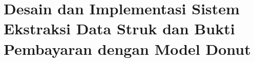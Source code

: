 \chapter{Desain dan Implementasi Sistem Ekstraksi Data Struk dan Bukti Pembayaran dengan Model Donut}
\label{chapter:desain-implementasi}








